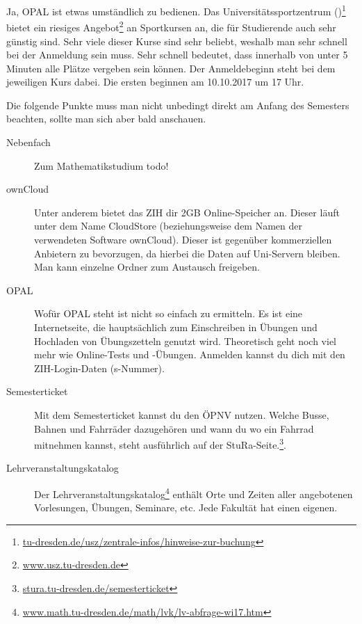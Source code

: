 \documentclass{scrartcl}
\begin{document}
\begin{description}
    Ja, OPAL ist etwas umständlich zu bedienen.
     Das Universitätssportzentrum ()\footnote{\url{tu-dresden.de/usz/zentrale-infos/hinweise-zur-buchung}} bietet ein riesiges Angebot\footnote{\url{www.usz.tu-dresden.de}} an
    Sportkursen an, die für Studierende auch sehr günstig sind.
    Sehr viele dieser Kurse sind sehr beliebt, weshalb man sehr schnell bei der Anmeldung sein muss.
    Sehr schnell bedeutet, dass innerhalb von unter 5 Minuten alle Plätze vergeben sein können.
    Der Anmeldebeginn steht bei dem jeweiligen Kurs dabei. Die ersten beginnen am 10.10.2017 um 17 Uhr.
\end{description}
Die folgende Punkte muss man nicht unbedingt direkt am Anfang des Semesters beachten, sollte man
sich aber bald anschauen.
\begin{description}
  \item[Nebenfach] Zum Mathematikstudium todo! 
  
  \item[ownCloud] Unter anderem bietet das ZIH dir 2GB Online-Speicher an.
    Dieser läuft unter dem Name CloudStore (beziehungsweise dem Namen der verwendeten Software ownCloud).
    Dieser ist gegenüber kommerziellen Anbietern zu bevorzugen,
    da hierbei die Daten auf Uni-Servern bleiben. Man kann einzelne Ordner zum Austausch freigeben.
  \item[OPAL] Wofür OPAL steht ist nicht so einfach zu ermitteln. Es ist eine Internetseite, die hauptsächlich
    zum Einschreiben in Übungen und Hochladen von Übungszetteln genutzt wird. Theoretisch geht noch viel mehr
    wie Online-Tests und -Übungen.
    Anmelden kannst du dich mit den ZIH-Login-Daten (s-Nummer).
  \item[Semesterticket] Mit dem Semesterticket kannst du den ÖPNV nutzen. Welche Busse, Bahnen und Fahrräder dazugehören und wann du wo ein Fahrrad mitnehmen kannst,
    steht ausführlich auf der StuRa-Seite.\footnote{\url{stura.tu-dresden.de/semesterticket}}.
  \item[Lehrveranstaltungskatalog] Der Lehrveranstaltungskatalog\footnote{\url{www.math.tu-dresden.de/math/lvk/lv-abfrage-wi17.htm}} enthält Orte und Zeiten aller angebotenen
    Vorlesungen, Übungen, Seminare, etc. Jede Fakultät hat einen eigenen.
  
\end{description}
\end{document}
